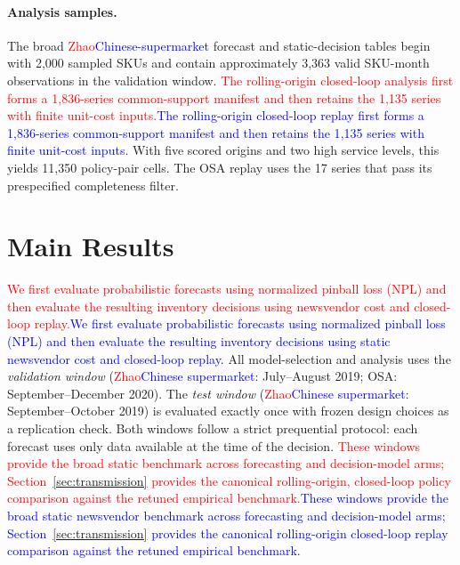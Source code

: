 \documentclass[msom,dblanonrev]{informs4}
\newcommand{\add}[1]{\textcolor{blue}{#1}}
\newcommand{\reduce}[1]{\textcolor{red}{#1}\hspace{0.5em}}
\begin{document}
\paragraph{Analysis samples.}
The broad \reduce{Zhao}\add{Chinese-supermarket} forecast and static-decision tables begin with 2{,}000 sampled SKUs and contain approximately 3{,}363 valid SKU-month observations in the validation window.
\reduce{The rolling-origin closed-loop analysis first forms a 1{,}836-series common-support manifest and then retains the 1{,}135 series with finite unit-cost inputs.}\add{The rolling-origin closed-loop replay first forms a 1{,}836-series common-support manifest and then retains the 1{,}135 series with finite unit-cost inputs.}
With five scored origins and two high service levels, this yields 11{,}350 policy-pair cells.
The OSA replay uses the 17 series that pass its prespecified completeness filter.


\section{Main Results}\label{sec:results}

\reduce{We first evaluate probabilistic forecasts using normalized pinball loss (NPL) and then evaluate the resulting inventory decisions using newsvendor cost and closed-loop replay.}\add{We first evaluate probabilistic forecasts using normalized pinball loss (NPL) and then evaluate the resulting inventory decisions using static newsvendor cost and closed-loop replay.}
All model-selection and analysis uses the \emph{validation window} (\reduce{Zhao}\add{Chinese supermarket}: July--August 2019; OSA: September--December 2020).
The \emph{test window} (\reduce{Zhao}\add{Chinese supermarket}: September--October 2019) is evaluated exactly once with frozen design choices as a replication check.
Both windows follow a strict prequential protocol: each forecast uses only data available at the time of the decision.
\reduce{These windows provide the broad static benchmark across forecasting and decision-model arms; Section~\ref{sec:transmission} provides the canonical rolling-origin, closed-loop policy comparison against the retuned empirical benchmark.}\add{These windows provide the broad static newsvendor benchmark across forecasting and decision-model arms; Section~\ref{sec:transmission} provides the canonical rolling-origin closed-loop replay comparison against the retuned empirical benchmark.}
\end{document}
